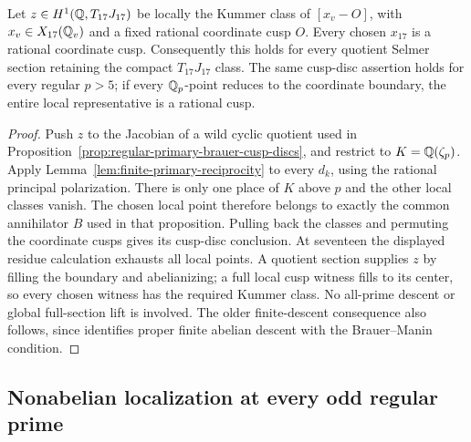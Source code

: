 \begin{corollary}
\label{cor:seventeen-primary-local}
Let $z\in H^1(\mathbb Q,T_{17}J_{17})$ be locally the Kummer class
of $[x_v-O]$, with $x_v\in X_{17}(\mathbb Q_v)$ and a fixed rational
coordinate cusp $O$. Every chosen $x_{17}$ is a rational
coordinate cusp. Consequently this holds for every quotient
Selmer section retaining the compact $T_{17}J_{17}$ class.
The same cusp-disc assertion holds for every regular $p>5$;
if every $\mathbb Q_p$-point reduces to the coordinate boundary, the
entire local representative is a rational cusp.
\end{corollary}
\begin{proof}
Push $z$ to the Jacobian of a wild cyclic quotient used in
Proposition~\ref{prop:regular-primary-brauer-cusp-discs}, and
restrict to $K=\mathbb Q(\zeta_p)$. Apply
Lemma~\ref{lem:finite-primary-reciprocity} to every $d_k$, using
the rational principal polarization. There is only one place
of $K$ above $p$ and the other local classes vanish. The chosen
local point therefore belongs to exactly the common annihilator
$B$ used in that proposition. Pulling back the classes and
permuting the coordinate cusps gives its cusp-disc conclusion.
At seventeen the displayed residue calculation exhausts all
local points. A quotient section supplies $z$ by filling the
boundary and abelianizing; a full local cusp witness fills to
its center, so every chosen witness has the required Kummer class.
No all-prime descent or global full-section lift is involved.
The older finite-descent consequence also follows, since
\citet[Corollary~7.3, p.~379]{Stoll2007} identifies proper finite
abelian descent with the Brauer--Manin condition.
\end{proof}

\subsection{Nonabelian localization at every odd regular prime}
\label{subsec:regular-nonabelian}

